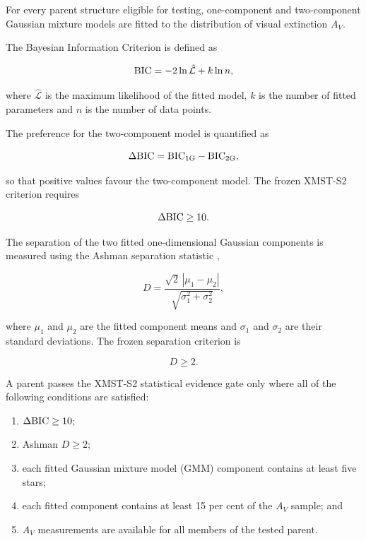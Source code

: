 \documentclass[fleqn,usenatbib]{rasti}
\begin{document}
For every parent structure eligible for testing, one-component and
two-component Gaussian mixture models are fitted to the distribution of
visual extinction $A_V$.

The Bayesian Information Criterion is defined as

\begin{equation}
{\rm BIC}
=
-2\ln \hat{\mathcal{L}}
+
k\ln n,
\label{eq:bic}
\end{equation}

where $\hat{\mathcal{L}}$ is the maximum likelihood of the fitted model,
$k$ is the number of fitted parameters and $n$ is the number of data points.

The preference for the two-component model is quantified as

\begin{equation}
\Delta{\rm BIC}
=
{\rm BIC}_{1{\rm G}}
-
{\rm BIC}_{2{\rm G}},
\label{eq:delta_bic}
\end{equation}

so that positive values favour the two-component model. The frozen
XMST-S2 criterion requires

\[
\Delta{\rm BIC}\geq10.
\]

The separation of the two fitted one-dimensional Gaussian components is
measured using the Ashman separation statistic \citep{Ashman1994},

\begin{equation}
D =
\frac{\sqrt{2}\,|\mu_1-\mu_2|}
     {\sqrt{\sigma_1^2+\sigma_2^2}},
\label{eq:ashman_d}
\end{equation}

where $\mu_1$ and $\mu_2$ are the fitted component means and $\sigma_1$
and $\sigma_2$ are their standard deviations. The frozen separation
criterion is

\[
D\geq2.
\]

A parent passes the XMST-S2 statistical evidence gate only where all of the
following conditions are satisfied:

\begin{enumerate}
    \item $\Delta{\rm BIC}\geq10$;
    \item Ashman $D\geq2$;
    \item each fitted Gaussian mixture model (GMM) component contains at least five stars;
    \item each fitted component contains at least 15 per cent of the 
          $A_V$ sample; and
    \item  $A_V$ measurements are available for all members of the
          tested parent.
\end{enumerate}
\end{document}
